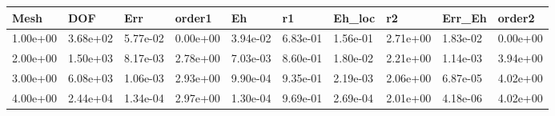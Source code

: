 \begin{tabular}{llllllllll}
Mesh & DOF & Err & order1 & Eh & r1 & Eh_loc & r2 & Err_Eh & order2 \\ 
\hline 
1.00e+00 & 3.68e+02 & 5.77e-02 & 0.00e+00 & 3.94e-02 & 6.83e-01 & 1.56e-01 & 2.71e+00 & 1.83e-02 & 0.00e+00 \\ 
2.00e+00 & 1.50e+03 & 8.17e-03 & 2.78e+00 & 7.03e-03 & 8.60e-01 & 1.80e-02 & 2.21e+00 & 1.14e-03 & 3.94e+00 \\ 
3.00e+00 & 6.08e+03 & 1.06e-03 & 2.93e+00 & 9.90e-04 & 9.35e-01 & 2.19e-03 & 2.06e+00 & 6.87e-05 & 4.02e+00 \\ 
4.00e+00 & 2.44e+04 & 1.34e-04 & 2.97e+00 & 1.30e-04 & 9.69e-01 & 2.69e-04 & 2.01e+00 & 4.18e-06 & 4.02e+00 \\ 
\hline 
\end{tabular}